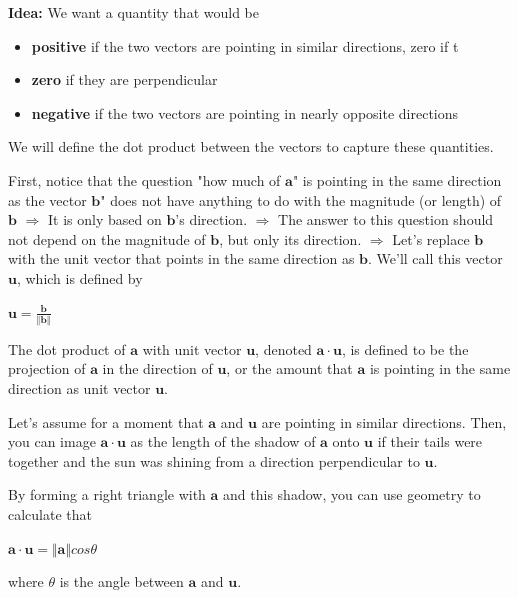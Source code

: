 \documentclass{report}
\begin{document}
\textbf{Idea:} We want a quantity that would be
\begin{itemize}
	\item \textbf{positive} if the two vectors are pointing in similar directions, zero if t
    \item \textbf{zero} if they are perpendicular
    \item \textbf{negative} if the two vectors are pointing in nearly opposite directions
\end{itemize}
We will define the dot product between the vectors to capture these quantities.\newline

First, notice that the question "how much of $\bm{a}$" is pointing in the same direction as the vector $\bm{b}$" does not have anything to do with the magnitude (or length) of $\bm{b}$\newline
$\Rightarrow$ It is only based on $\bm{b}$'s direction.\newline
$\Rightarrow$ The answer to this question should not depend on the magnitude of $\bm{b}$, but only its direction.\newline
$\Rightarrow$ Let's replace $\bm{b}$ with the unit vector that points in the same direction as $\bm{b}$. We'll call this vector $\bm{u}$, which is defined by\newline\newline
	\centerline{$\bm{u} = \frac{\bm{b}}{\Vert \bm{b} \Vert}$}\newline\newline

The dot product of $\bm{a}$ with unit vector $\bm{u}$, denoted $\bm{a} \cdot \bm{u}$, is defined to be the projection of $\bm{a}$ in the direction of $\bm{u}$, or the amount that $\bm{a}$ is pointing in the same direction as unit vector $\bm{u}$.\newline\newline

Let's assume for a moment that $\bm{a}$ and $\bm{u}$ are pointing in similar directions. Then, you can image $\bm{a} \cdot \bm{u}$ as the length of the shadow of $\bm{a}$ onto $\bm{u}$ if their tails were together and the sun was shining from a direction perpendicular to $\bm{u}$.\newline\newline

By forming a right triangle with $\bm{a}$ and this shadow, you can use geometry to calculate that\newline\newline
	\centerline{$\bm{a} \cdot \bm{u} = \Vert \bm{a} \Vert cos \theta$}\newline\newline
where $\theta$ is the angle between $\bm{a}$ and $\bm{u}$.\newline\newline
\end{document}
